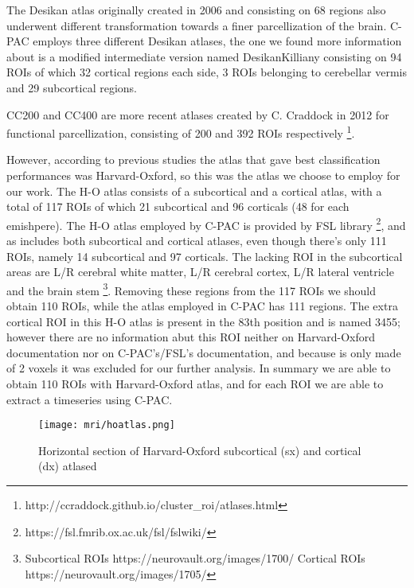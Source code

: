 \documentclass[10pt]{report}
\begin{document}
The Desikan atlas \cite{desikan2006} originally created in 2006 and consisting on 68 regions also underwent different transformation towards a finer parcellization of the brain. C-PAC employs three different Desikan atlases, the one we found more information about is a modified intermediate version named DesikanKilliany consisting on 94 ROIs of which 32 cortical regions each side, 3 ROIs belonging to cerebellar vermis and 29 subcortical regions.

CC200 and CC400 are more recent atlases created by C. Craddock in 2012 \cite{craddock2012} for functional parcellization, consisting of 200 and 392 ROIs respectively \footnote{http://ccraddock.github.io/cluster\_roi/atlases.html}.

However, according to previous studies \cite{spera-2019} the atlas that gave best classification performances was Harvard-Oxford, so this was the atlas we choose to employ for our work.
The H-O atlas consists of a subcortical and a cortical atlas, with a total of 117 ROIs of which 21 subcortical and 96 corticals (48 for each emishpere).
The H-O atlas employed by C-PAC is provided by FSL library \footnote{https://fsl.fmrib.ox.ac.uk/fsl/fslwiki/}, and as includes both subcortical and cortical atlases, even though there's only 111 ROIs, namely 14 subcortical and 97 corticals.
The lacking ROI in the subcortical areas are L/R cerebral white matter, L/R cerebral cortex, L/R lateral ventricle and the brain stem \footnote{Subcortical ROIs https://neurovault.org/images/1700/ \quad Cortical ROIs https://neurovault.org/images/1705/ }.
Removing these regions from the 117 ROIs we should obtain 110 ROIs, while the atlas employed in C-PAC has 111 regions.
The extra cortical ROI in this H-O atlas is present in the 83th position and is named 3455; however there are no information abut this ROI neither on Harvard-Oxford documentation nor on C-PAC's/FSL's documentation, and because is only made of 2 voxels it was excluded for our further analysis.
In summary we are able to obtain 110 ROIs with Harvard-Oxford atlas, and for each ROI we are able to extract a timeseries using C-PAC.

\begin{figure}[h]
\centering
\texttt{[image: mri/hoatlas.png]}
\caption{Horizontal section of Harvard-Oxford subcortical (sx) and cortical (dx) atlased}
\label{fig:hoatlas}
\end{figure}
\end{document}
